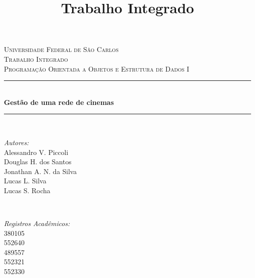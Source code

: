 \documentclass[a4paper]{article}
\begin{document}
\title{Trabalho Integrado}
\begin{titlepage}

\newcommand{\HRule}{\rule{\linewidth}{0.5mm}} %

\center %
 

\textsc{\LARGE Universidade Federal de São Carlos}\\[1.5cm] %
\textsc{\Large Trabalho Integrado}\\[0.5cm] %
\textsc{\large Programação Orientada a Objetos e Estrutura de Dados I}\\[0.5cm] %


\HRule \\[0.4cm]
{ \huge \bfseries Gestão de uma rede de cinemas}\\[0.4cm] %
\HRule \\[1.5cm]
 

\begin{minipage}{0.4\textwidth}
\begin{flushleft} \large
\emph{Autores:}\\
Alessandro V. Piccoli\\
Douglas H. dos Santos\\
Jonathan A. N. da Silva\\
Lucas L. Silva\\
Lucas S. Rocha

\end{flushleft}
\end{minipage}
~
\begin{minipage}{0.4\textwidth}
\begin{flushright} \large
\emph{Registros Acadêmicos:} \\
380105\\
552640\\
489557\\
552321\\
552330


\end{flushright}
\end{minipage}
\end{titlepage}
\end{document}
